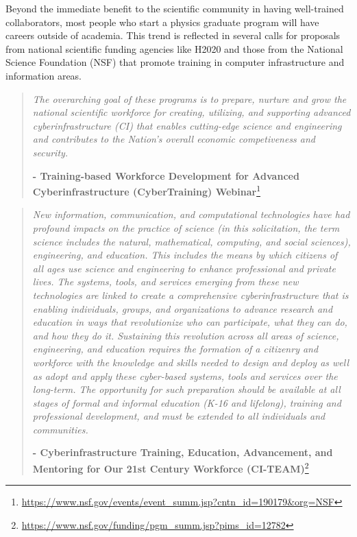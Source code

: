 \documentclass[12pt,a4paper]{article}
\begin{document}
Beyond the immediate benefit to the scientific community in having well-trained
collaborators, most people who start a physics graduate program will have
careers outside of academia. This trend is reflected in several calls for
proposals from national scientific funding agencies like H2020 and those from
the National Science Foundation (NSF) that promote training in computer
infrastructure and information areas.


\begin{quote}
\it The overarching goal of these programs is to prepare, nurture and grow the national scientific workforce for creating, utilizing, and supporting advanced cyberinfrastructure (CI) that enables cutting-edge science and engineering and contributes to the Nation's overall economic competiveness and security. 

{\bf - Training-based Workforce Development for Advanced Cyberinfrastructure (CyberTraining) Webinar}\footnote{ \url{https://www.nsf.gov/events/event_summ.jsp?cntn_id=190179&org=NSF}}
\end{quote}


\begin{quote}
\it New information, communication, and computational technologies have had profound impacts on the practice of science (in this solicitation, the term science includes the natural, mathematical, computing, and social sciences),  engineering, and education. This includes the means by which citizens of all ages use science  and engineering to enhance professional and private lives.  The systems, tools, and services emerging from these new technologies are linked to create a comprehensive cyberinfrastructure that is enabling individuals, groups, and organizations to advance research and education in ways that revolutionize who can participate, what they can do, and how they do it. Sustaining this revolution across all areas of science, engineering, and education requires the formation of a citizenry and workforce with the knowledge and skills needed to design and deploy as well as adopt and apply these cyber-based systems, tools and services over the long-term. The opportunity for such preparation should be available at all stages of formal and informal education (K-16 and lifelong), training and professional development, and must be extended to all individuals and communities. 

{\bf - Cyberinfrastructure Training, Education, Advancement, and Mentoring for Our 21st Century Workforce (CI-TEAM)}\footnote{ \url{https://www.nsf.gov/funding/pgm_summ.jsp?pims_id=12782}}
\end{quote}
\end{document}
